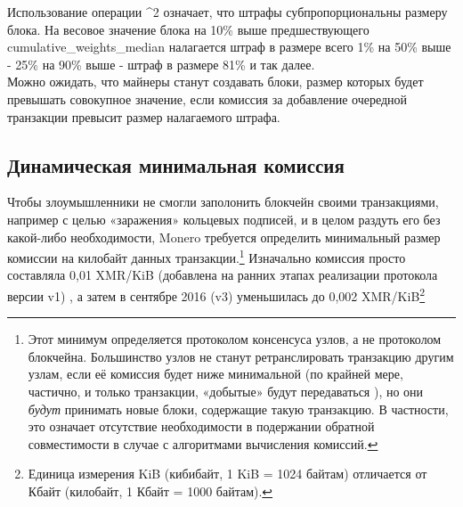 Использование операции \^{}2 означает, что штрафы субпропорциональны размеру блока. На весовое значение блока на 10\% выше предшествующего cumulative\_weights\_median налагает\-ся штраф в размере всего 1\% на 50\% выше - 25\% на 90\% выше - штраф в размере 81\% и так далее. \cite{monero-coin-emission}\\

Можно ожидать, что майнеры станут создавать блоки, размер которых будет превышать совокупное значение, если комиссия за добавление очередной транзакции превысит размер налагаемого штрафа.


\subsection{Динамическая минимальная комиссия}
\label{subsec:dynamic-minimum-fee} %

Чтобы злоумышленники не смогли заполонить блокчейн своими транзакциями, например с целью «заражения» кольцевых подписей, и в целом раздуть его без какой-либо необходимости, Monero требуется определить минимальный размер комиссии на килобайт данных транзак\-ции.\footnote{Этот минимум определяется протоколом консенсуса узлов, а не протоколом блокчейна. Большинство узлов не станут ретранслировать транзакцию другим узлам, если её комиссия будет ниже минимальной (по крайней мере, частично, и только транзакции, «добытые» будут передаваться \cite{articmine-36c3-dynamics}), но они {\em будут} принимать новые блоки, содержащие такую транзакцию. В частности, это означает отсутствие необходимости в подержании обратной совместимости в случае с алгоритмами вычисления комиссий.} Изначально комиссия просто составляла 0,01 XMR/KiB (добавлена на ранних этапах реализации протокола версии v1) \cite{fee-old-stackexchange}, а затем в сентябре 2016 (v3) уменьшилась до 0,002 XMR/KiB\footnote{Единица измерения KiB (кибибайт, 1 KiB = 1024 байтам) отличается от Кбайт (килобайт, 1 Кбайт = 1000 байтам).}%

